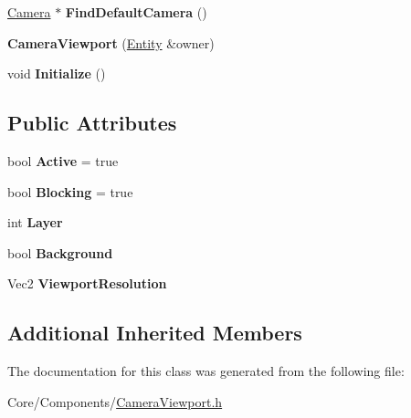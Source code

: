 \begin{DoxyCompactItemize}
\item 
\hypertarget{classDCEngine_1_1Components_1_1CameraViewport_aab6e0b5b5d22f35610d51f076f228970}{\hyperlink{classDCEngine_1_1Components_1_1Camera}{Camera} $\ast$ {\bfseries Find\-Default\-Camera} ()}\label{classDCEngine_1_1Components_1_1CameraViewport_aab6e0b5b5d22f35610d51f076f228970}

\item 
\hypertarget{classDCEngine_1_1Components_1_1CameraViewport_a25b4bf57ef4d6df3f6a41d03216da0ac}{{\bfseries Camera\-Viewport} (\hyperlink{classDCEngine_1_1Entity}{Entity} \&owner)}\label{classDCEngine_1_1Components_1_1CameraViewport_a25b4bf57ef4d6df3f6a41d03216da0ac}

\item 
\hypertarget{classDCEngine_1_1Components_1_1CameraViewport_a37da7e3da0b5608fab56f4d502309212}{void {\bfseries Initialize} ()}\label{classDCEngine_1_1Components_1_1CameraViewport_a37da7e3da0b5608fab56f4d502309212}

\end{DoxyCompactItemize}
\subsection*{Public Attributes}
\begin{DoxyCompactItemize}
\item 
\hypertarget{classDCEngine_1_1Components_1_1CameraViewport_a5c64d22cc685e9a86d6886e3a5056471}{bool {\bfseries Active} = true}\label{classDCEngine_1_1Components_1_1CameraViewport_a5c64d22cc685e9a86d6886e3a5056471}

\item 
\hypertarget{classDCEngine_1_1Components_1_1CameraViewport_a24b4e8a5cf05f5af35023ddb3e654213}{bool {\bfseries Blocking} = true}\label{classDCEngine_1_1Components_1_1CameraViewport_a24b4e8a5cf05f5af35023ddb3e654213}

\item 
\hypertarget{classDCEngine_1_1Components_1_1CameraViewport_a4f62700d22c69fe4cb1b26f1853acc2e}{int {\bfseries Layer}}\label{classDCEngine_1_1Components_1_1CameraViewport_a4f62700d22c69fe4cb1b26f1853acc2e}

\item 
\hypertarget{classDCEngine_1_1Components_1_1CameraViewport_af3efbabed3db728c6859c31e47cdfafa}{bool {\bfseries Background}}\label{classDCEngine_1_1Components_1_1CameraViewport_af3efbabed3db728c6859c31e47cdfafa}

\item 
\hypertarget{classDCEngine_1_1Components_1_1CameraViewport_a792345524cc836e3206cf38f54500b1c}{Vec2 {\bfseries Viewport\-Resolution}}\label{classDCEngine_1_1Components_1_1CameraViewport_a792345524cc836e3206cf38f54500b1c}

\end{DoxyCompactItemize}
\subsection*{Additional Inherited Members}


The documentation for this class was generated from the following file\-:\begin{DoxyCompactItemize}
\item 
Core/\-Components/\hyperlink{CameraViewport_8h}{Camera\-Viewport.\-h}\end{DoxyCompactItemize}
